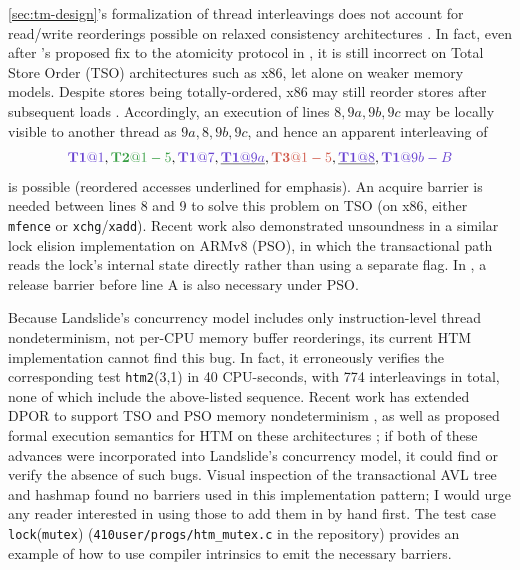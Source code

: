 \cref{sec:tm-design}'s formalization of thread interleavings does not account for read/write reorderings
possible on relaxed consistency architectures \cite{memory-consistency-models}.
In fact,
even after \cite{tm-benchmark-cmu}'s proposed fix to the atomicity protocol in ,
it is still incorrect on Total Store Order (TSO) architectures such as x86,
let alone on weaker memory models.
Despite stores being totally-ordered, x86 may still reorder stores after subsequent loads
\cite{sully-thesis}.
Accordingly, an execution of lines $8,9a,9b,9c$
may be locally visible to another thread as $9a,8,9b,9c$,
and hence an apparent interleaving of
\[
        \tiat{1},\tjat{1-5},\tiat{7},\underline{\tiat{9a}},\tkat{1-5},\underline{\tiat{8}},\tiat{9b-B}
\]
is possible
(reordered accesses underlined for emphasis).
An acquire barrier is needed between lines 8 and 9 to solve this problem on TSO \cite{tsx-need-barrier}
(on x86, either {\tt mfence} or {\tt xchg}/{\tt xadd}).
Recent work \cite{relaxed-transactions-pldi} also demonstrated unsoundness
in a similar lock elision implementation on ARMv8 (PSO),
in which the transactional path reads the lock's internal state directly
rather than using a separate flag.
In , a release barrier before line A is also necessary under PSO.

Because Landslide's concurrency model includes only instruction-level thread nondeterminism,
not per-CPU memory buffer reorderings,
its current HTM implementation cannot find this bug.
In fact, it erroneously verifies the corresponding test {\tt htm2}(3,1)
in 40 CPU-seconds,
with 774 interleavings in total,
none of which include the above-listed sequence.
Recent work has extended DPOR to support TSO and PSO memory nondeterminism \cite{tsopso},
as well as proposed formal execution semantics for HTM on these architectures
\cite{relaxed-transactions-popl,relaxed-transactions-pldi};
if both of these advances were incorporated into Landslide's concurrency model,
it could find or verify the absence of such bugs.
Visual inspection of the transactional AVL tree and hashmap
\cite{tm-benchmark-cmu} found no barriers used in this implementation pattern;
I would urge any reader interested in using those to add them in by hand first.
The test case {\tt lock}({\tt mutex}) ({\tt 410user/progs/htm\_mutex.c} in the repository)
provides an example of how to use compiler intrinsics to emit the necessary barriers.

